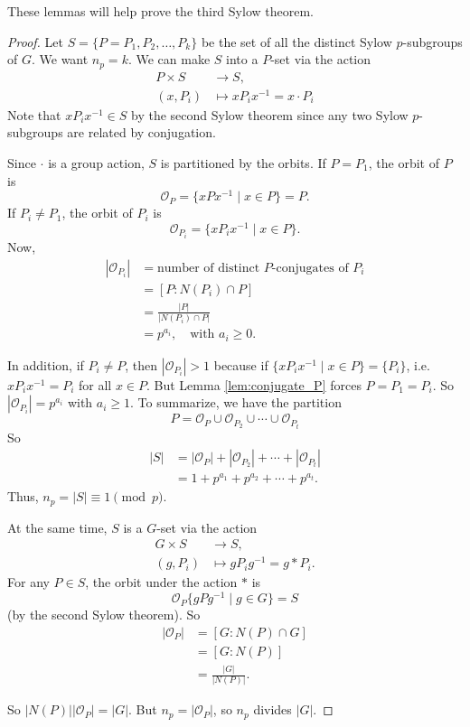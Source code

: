 These lemmas will help prove the third Sylow theorem.

\begin{proof}
	Let $S=\{P=P_1,P_2,\hdots,P_k\}$ be the set of all the distinct Sylow $p$-subgroups of $G$. We want $n_p=k$. We can make $S$ into a $P$-set via the action
	\begin{align*}
		P\times S&\to S,\\
		(x,P_i)&\mapsto xP_ix^{-1}=x\cdot P_i
	\end{align*}
	Note that $xP_ix^{-1}\in S$ by the second Sylow theorem since any two Sylow $p$-subgroups are related by conjugation.

	Since $\cdot$ is a group action, $S$ is partitioned by the orbits. If $P=P_1$, the orbit of $P$ is
	$$\mathcal O_P=\{xPx^{-1}\mid x\in P\}=P.$$
	If $P_i\neq P_1$, the orbit of $P_i$ is
	$$\mathcal O_{P_i}=\{x{P_i}x^{-1}\mid x\in P\}.$$
	Now,
	\begin{align*}
		|\mathcal O_{P_i}|&=\text{number of distinct $P$-conjugates of $P_i$}\\
		&=[P:N(P_i)\cap P]\\
		&=\frac{|P|}{|N(P_i)\cap P|}\\
		&=p^{a_i},\quad\text{with $a_i\geq 0$}.
	\end{align*}

	In addition, if $P_i\neq P$, then $|\mathcal O_{P_i}|>1$ because if $\{xP_ix^{-1}\mid x\in P\}=\{P_i\}$, i.e. $xP_ix^{-1}=P_i$ for all $x\in P$. But Lemma \ref{lem:conjugate_P} forces $P=P_1=P_i$. So $|\mathcal O_{P_i}|=p^{a_i}$ with $a_i\geq 1$. To summarize, we have the partition
	$$P=\mathcal O_P\cup\mathcal O_{P_2}\cup\cdots\cup\mathcal O_{P_t}$$
	So
	\begin{align*}
		|S|&=|\mathcal O_P|+|\mathcal O_{P_2}|+\cdots +|\mathcal O_{P_t}|\\
		&=1+p^{a_1}+p^{a_2}+\cdots +p^{a_t}.
	\end{align*}
	Thus, $n_p=|S|\equiv 1\pmod p$.

	At the same time, $S$ is a $G$-set via the action
	\begin{align*}
		G\times S&\to S,\\
		(g,P_i)&\mapsto gP_ig^{-1}=g*P_i.
	\end{align*}
	For any $P\in S$, the orbit under the action $*$ is
	$$\mathcal O_P\{gPg^{-1}\mid g\in G\}=S$$
	(by the second Sylow theorem). So
	\begin{align*}
		|\mathcal O_P|&=[G:N(P)\cap G]\\
		&=[G:N(P)]\\
		&=\frac{|G|}{|N(P)|}.
	\end{align*}

	So $|N(P)||\mathcal O_P|=|G|$. But $n_p=|\mathcal O_P|$, so $n_p$ divides $|G|$.
\end{proof}

